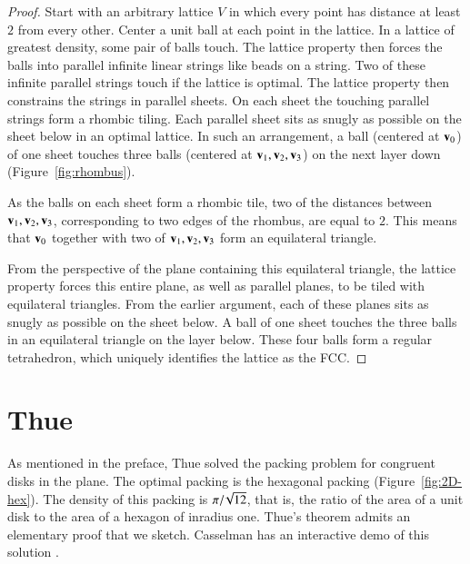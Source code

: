 \begin{proof}
Start with an arbitrary lattice $V$ in which every point has distance 
at least $2$ from every other.  Center a unit ball at each point in
the lattice.  In a lattice of greatest density, some pair of balls
touch.  The lattice property then forces the balls into parallel
infinite linear strings like beads on a string.  Two of these infinite
parallel strings touch if the lattice is  optimal.  The
lattice property then constrains the strings in parallel sheets.  On
each sheet the touching parallel strings form a rhombic tiling.  Each
parallel sheet sits as snugly as possible on the sheet below in an optimal
lattice.  In such an arrangement, a ball (centered at
${\mathbf v}_0$) of one sheet touches three balls (centered at
${\mathbf v}_1,{\mathbf v}_2,{\mathbf v}_3$) on the next layer down (Figure~\ref{fig:rhombus}).

\figAFRJFRK %


As the balls on each sheet form a rhombic tile, two of the distances
between ${\mathbf v}_1,{\mathbf v}_2,{\mathbf v}_3$, corresponding to two edges of the rhombus, are
equal to $2$.  This means that ${\mathbf v}_0$ together with two of
${\mathbf v}_1,{\mathbf v}_2,{\mathbf v}_3$ form an equilateral triangle.  

From the perspective of the plane containing this equilateral
triangle, the lattice property forces this entire plane, as well as
parallel planes, to be tiled with equilateral triangles.  From the
earlier argument, each of these planes sits as snugly as possible on
the sheet below.  A ball of one sheet touches the three balls in an
equilateral triangle on the layer below.  These four balls form a
regular tetrahedron, which uniquely identifies the lattice as the FCC.
\end{proof}






\section{Thue}\label{sec:thue}


As mentioned in the preface, Thue solved the packing problem for
congruent disks in the plane.  The optimal packing is the hexagonal
packing (Figure~\ref{fig:2D-hex}).  The density of this packing is
$\pi/\!\sqrt{12}$, that is, the ratio of the area of a unit disk to the
area of a hexagon of inradius one.  Thue's theorem admits an
elementary proof that we sketch.  Casselman has an 
interactive demo of this solution \cite{casselman:pennies}.


